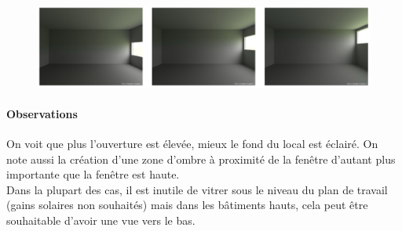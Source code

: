 \documentclass[11pt]{report}
\begin{document}
\begin{figure}[h]
\centering
\includegraphics[width=\linewidth]{pho3}
\end{figure}


\paragraph{Observations} On voit que plus l'ouverture est élevée, mieux le fond du local est éclairé. On note aussi la création d'une zone d'ombre à proximité de la fenêtre d'autant plus importante que la fenêtre est haute.\\


Dans la plupart des cas, il est inutile de vitrer sous le niveau du plan de travail (gains solaires non souhaités) mais dans les bâtiments hauts, cela peut être souhaitable d'avoir une vue vers le bas.\\
\end{document}
